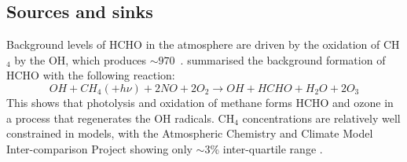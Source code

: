   \subsection{Sources and sinks}
    \label{LR:HCHO:Sources}
     
    Background levels of HCHO in the atmosphere are driven by the oxidation of CH$_4$ by the OH$\dot{}$, which produces $\sim 970$\tgpyr ~\parencite{FortemsCheiney2012}.
    \textcite{Atkinson2000} summarised the background formation of HCHO with the following reaction:
    \begin{equation*} \label{LR:HCHO:Sources:eqn_MethaneBackground}
      OH + CH_4 (+ h\nu) + 2NO + 2O_2 \rightarrow OH + HCHO + H_2O + 2O_3
    \end{equation*}
    This shows that photolysis and oxidation of methane forms HCHO and ozone in a process that regenerates the OH radicals.
    CH$_4$ concentrations are relatively well constrained in models, with the Atmospheric Chemistry and Climate Model Inter-comparison Project showing only $\sim3$\% inter-quartile range \parencite{Young2013}.
    
